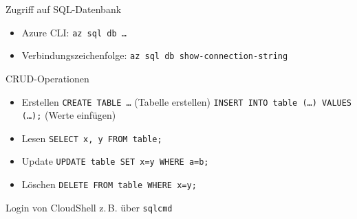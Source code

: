 \begin{flashcard}[Definition]{Zugriff auf SQL-Datenbank}
    \begin{itemize}
        \item Azure CLI: \texttt{az sql db \ldots}
        \item Verbindungszeichenfolge: \texttt{az sql db show-connection-string}
    \end{itemize}
\end{flashcard}



\begin{flashcard}[Definition]{CRUD-Operationen}
    \begin{itemize}
        \item Erstellen\newline
            \texttt{CREATE TABLE \ldots} (Tabelle erstellen)\newline
            \texttt{INSERT INTO table (\ldots) VALUES (\ldots);} (Werte einfügen)
        \item Lesen\newline
            \texttt{SELECT x, y FROM table;}
        \item Update\newline
            \texttt{UPDATE table SET x=y WHERE a=b;}
        \item Löschen\newline
            \texttt{DELETE FROM table WHERE x=y;}
    \end{itemize}
    Login von CloudShell z.\,B. über \texttt{sqlcmd}
\end{flashcard}
